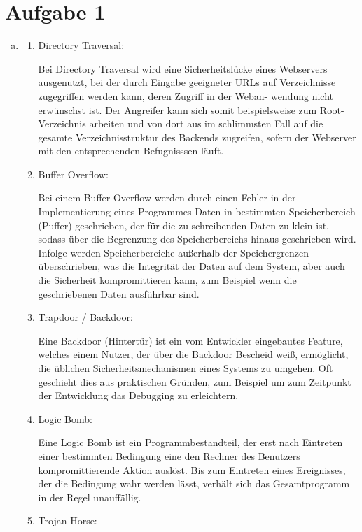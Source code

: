\documentclass[numbers=noendperiod]{scrartcl}
\begin{document}
\section*{Aufgabe 1}
\begin{enumerate}[a)]
	\item 
	\begin{enumerate}
		\item Directory Traversal:
		
		Bei Directory Traversal wird eine Sicherheitslücke eines Webservers ausgenutzt, bei der durch
		Eingabe geeigneter URLs auf Verzeichnisse zugegriffen werden kann, deren Zugriff in der Weban-
		wendung nicht erwünschst ist. Der Angreifer kann sich somit beispielsweise zum Root-Verzeichnis
		arbeiten und von dort aus im schlimmsten Fall auf die gesamte Verzeichnisstruktur des Backends zugreifen, sofern der
		Webserver mit den entsprechenden Befugnisssen läuft.
		
		\item Buffer Overflow:
		
		Bei einem Buffer Overflow werden durch einen Fehler in der Implementierung eines Programmes Daten in
		bestimmten Speicherbereich (Puffer) geschrieben, der für die zu schreibenden Daten zu klein
		ist, sodass über die Begrenzung des Speicherbereichs hinaus geschrieben wird. Infolge werden Speicherbereiche
		außerhalb der Speichergrenzen überschrieben, was die Integrität der Daten auf dem System, aber auch die
		Sicherheit kompromittieren kann, zum Beispiel wenn die geschriebenen Daten ausführbar sind.
		
		\item Trapdoor / Backdoor:
		
		Eine Backdoor (Hintertür) ist ein vom Entwickler eingebautes Feature, welches einem Nutzer, der über
		die Backdoor Bescheid weiß, ermöglicht, die üblichen Sicherheitsmechanismen eines Systems zu umgehen.
		Oft geschieht dies aus praktischen Gründen, zum Beispiel um zum Zeitpunkt der Entwicklung das Debugging
		zu erleichtern.
		
		\item Logic Bomb:
		
		Eine Logic Bomb ist ein Programmbestandteil, der erst nach Eintreten einer bestimmten Bedingung eine den
		Rechner des Benutzers kompromittierende Aktion auslöst. Bis zum Eintreten eines Ereignisses, der die
		Bedingung wahr werden lässt, verhält sich das Gesamtprogramm in der Regel unauffällig.
		
		\item Trojan Horse:
		

\end{enumerate}
\end{enumerate}
\end{document}
